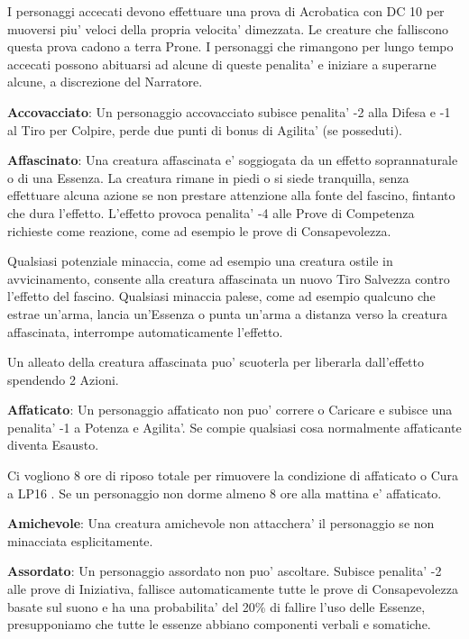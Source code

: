 \documentclass[a4paper,11pt,twoside,openany]{book}
\begin{document}
{		I personaggi accecati devono effettuare una prova di Acrobatica con DC 10 per muoversi piu' veloci della propria velocita' dimezzata. Le creature che falliscono questa prova cadono a terra Prone. I personaggi che rimangono per lungo tempo accecati possono abituarsi ad alcune di queste penalita' e iniziare a superarne alcune, a discrezione del Narratore.
		
		\textbf{Accovacciato}: Un personaggio accovacciato subisce penalita' -2 alla Difesa e -1 al Tiro per Colpire, perde due punti di bonus di Agilita' (se posseduti).
		
		\textbf{Affascinato}: Una creatura affascinata e' soggiogata da un effetto soprannaturale o di una Essenza. La creatura rimane in piedi o si siede tranquilla, senza effettuare alcuna azione se non prestare attenzione alla fonte del fascino, fintanto che dura l'effetto. L'effetto provoca penalita' -4 alle Prove di Competenza richieste come reazione, come ad esempio le prove di Consapevolezza. 
		
		Qualsiasi potenziale minaccia, come ad esempio una creatura ostile in avvicinamento, consente alla creatura affascinata un nuovo Tiro Salvezza contro l'effetto del fascino. Qualsiasi minaccia palese, come ad esempio qualcuno che estrae un'arma, lancia un'Essenza o punta un'arma a distanza verso la creatura affascinata, interrompe automaticamente l'effetto. 
		
		Un alleato della creatura affascinata puo' scuoterla per liberarla dall'effetto spendendo 2 Azioni.
		
		\textbf{Affaticato}: Un personaggio affaticato non puo' correre o Caricare e subisce una penalita' -1 a Potenza e Agilita'. Se compie qualsiasi cosa normalmente affaticante diventa Esausto. 
		
		Ci vogliono 8 ore di riposo totale per rimuovere la condizione di affaticato o Cura a LP16 . Se un personaggio non dorme almeno 8 ore alla mattina e' affaticato.
		
		\textbf{Amichevole}: Una creatura amichevole non attacchera' il personaggio se non minacciata esplicitamente.
		
		\textbf{Assordato}: Un personaggio assordato non puo' ascoltare. Subisce penalita' -2 alle prove di Iniziativa, fallisce automaticamente tutte le prove di Consapevolezza basate sul suono e ha una probabilita' del 20\% di fallire l'uso delle Essenze, presupponiamo che tutte le essenze abbiano componenti verbali e somatiche.
		
}
\end{document}
